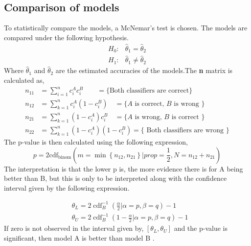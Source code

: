 \documentclass[11pt, fleqn, titlepage]{article}
\begin{document}
\subsection*{Comparison of models} \vspace*{-0.2cm}
To statistically compare the models, a McNemar's test is chosen. The models are compared under the following hypothesis. 
\begin{align*}\label{key}
H_0 : & \hat \theta_1 =  \hat \theta_2 \\
H_1 : & \hat \theta_1 \neq  \hat \theta_2
\end{align*}
Where $ \hat \theta_1 $ and $ \hat \theta_2  $ are the estimated accuracies of the models.\newline The \textbf{n} matrix is calculated as, 
\begin{equation*}\label{key}
\begin{aligned}
n_{11} &=\sum_{i=1}^{n} c_{i}^{A} c_{i}^{B} \qquad= \{ \text{Both classifiers are correct} \} \\
n_{12} &=\sum_{k=1}^{n} c_{i}^{A}\left(1-c_{i}^{B}\right) \quad=\{A \text { is correct, } B \text { is wrong }\} \\
n_{21} &=\sum_{k=1}^{n}\left(1-c_{i}^{A}\right) c_{i}^{B} \quad=\{A \text { is wrong, } B \text { is correct }\} \\
n_{22} &=\sum_{k=1}^{n}\left(1-c_{i}^{A}\right)\left(1-c_{i}^{B}\right)=\{\text { Both classifiers are wrong }\}
\end{aligned}
\end{equation*}
\noindent
The p-value is then calculated using the following expression, 
\begin{equation*}\label{key}
p=2 \mathrm{cdf}_{\mathrm{binom}}\left(m=\min \left\{n_{12}, n_{21}\right\} | prop=\frac{1}{2}, N=n_{12}+n_{21}\right)
\end{equation*}
\noindent
The interpretation is that the lower p is, the more evidence there is for A being better than B, but this is only to be interpreted along with the confidence interval given by the following expression.

\begin{equation*}\label{key}
\begin{aligned}
&\theta_{L}=2 \operatorname{cdf}_{B}^{-1}\left(\frac{\alpha}{2} | \alpha=p, \beta=q\right)-1\\
&\theta_{U}=2 \operatorname{cdf}_{B}^{-1}\left(1-\frac{\alpha}{2} | \alpha=p, \beta=q\right)-1
\end{aligned}
\end{equation*}
\noindent
If zero is not observed in the interval given by, $ [\theta_{L},\theta_{U}] $ and the p-value is significant, then model A is better than model B \cite{mlbog}.
\end{document}
